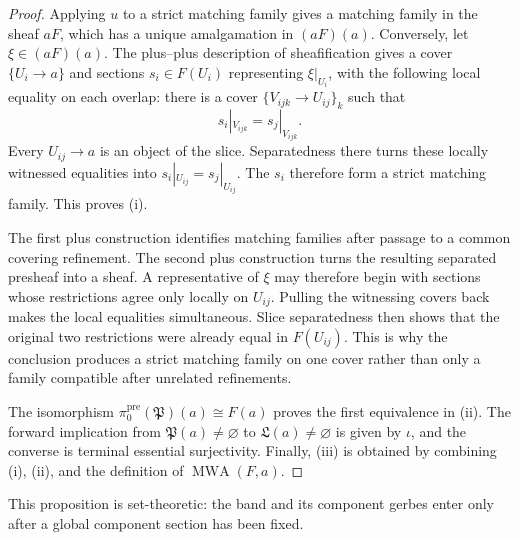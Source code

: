 \begin{proof}
Applying \(u\) to a strict matching family gives a matching family in the
sheaf \(aF\), which has a unique amalgamation in \((aF)(a)\).  Conversely,
let \(\xi\in(aF)(a)\).  The plus--plus description of sheafification gives
a cover \(\{U_i\to a\}\) and sections \(s_i\in F(U_i)\) representing
\(\xi|_{U_i}\), with the following local equality on each overlap: there is
a cover \(\{V_{ijk}\to U_{ij}\}_k\) such that
\[
 s_i|_{V_{ijk}}=s_j|_{V_{ijk}}.
\]
Every \(U_{ij}\to a\) is an object of the slice.  Separatedness there turns
these locally witnessed equalities into
\(s_i|_{U_{ij}}=s_j|_{U_{ij}}\).  The \(s_i\) therefore form a strict
matching family.  This proves (i).

The first plus construction identifies matching families after passage to a
common covering refinement.  The second plus construction turns the
resulting separated presheaf into a sheaf.  A representative of \(\xi\) may
therefore begin with sections whose restrictions agree only locally on
\(U_{ij}\).  Pulling the witnessing covers back makes the local equalities
simultaneous.  Slice separatedness then shows that the original two
restrictions were already equal in \(F(U_{ij})\).  This is why the conclusion
produces a strict matching family on one cover rather than only a family
compatible after unrelated refinements.

The isomorphism \(\pi_0^{\mathrm{pre}}(\mathfrak P)(a)\cong F(a)\) proves
the first equivalence in (ii).  The forward implication from
\(\mathfrak P(a)\ne\varnothing\) to \(\mathfrak L(a)\ne\varnothing\) is
given by \(\iota\), and the converse is terminal essential surjectivity.
Finally, (iii) is obtained by combining (i), (ii), and the definition of
\(\operatorname{MWA}(F,a)\).
\end{proof}

This proposition is set-theoretic: the band and its component gerbes enter
only after a global component section has been fixed.
